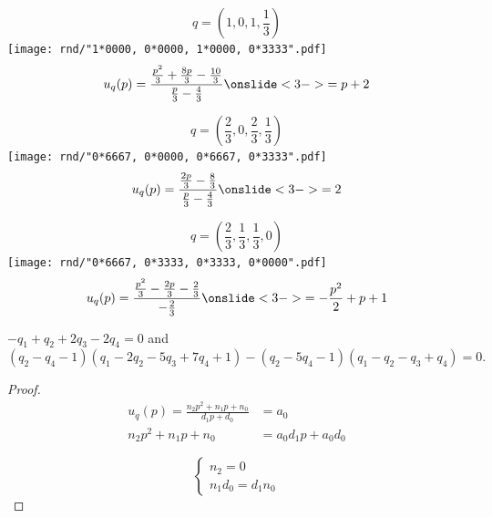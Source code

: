 \documentclass{beamer}
\begin{document}
\begin{frame}
  \centering
  \Large \[ q=\left(1, 0, 1, \frac{1}{3}\right) \]
  \texttt{[image: rnd/"1*0000, 0*0000, 1*0000, 0*3333".pdf]}
  \pause
  \small
    \begin{equation*} u_q(p) = \frac{\frac{p^2}{3} + \frac{8p}{3} - \frac{10}{3}}
                   {\frac{p}{3} - \frac{4}{3}} \onslide<3->{= p + 2}
    \end{equation*} 
\end{frame}

\begin{frame}
   \centering
   \Large \[ q=\left(\frac{2}{3}, 0, \frac{2}{3}, \frac{1}{3}\right) \]
   \texttt{[image: rnd/"0*6667, 0*0000, 0*6667, 0*3333".pdf]}
   \pause
   \small
    \begin{equation*} u_q(p) = \frac{\frac{2p}{3} - \frac{8}{3}}
                   {\frac{p}{3} - \frac{4}{3}} \onslide<3->{= 2}
    \end{equation*} 
 \end{frame}

\begin{frame}
  \centering
  \Large \[ q=\left(\frac{2}{3}, \frac{1}{3}, \frac{1}{3}, 0\right) \]
  \texttt{[image: rnd/"0*6667, 0*3333, 0*3333, 0*0000".pdf]}
   \pause
   \small
    \begin{equation*} u_q(p) = \frac{\frac{p^2}{3} - \frac{2p}{3} - \frac{2}{3}}
                   {- \frac{2}{3}} \onslide<3->{= -\frac{p^2}{2} + p + 1}
    \end{equation*} 
\end{frame}


\begin{frame}
\centering
\footnotesize
\begin{lemma}[Indifferent]\label{lemma:constant} 
\( -q_1 + q_2 + 2q_3 - 2q_4 = 0 \) and  \( (q_2 - q_4 - 1)(q_1 - 2q_2 - 5q_3 + 7q_4 + 1) -(q_2 - 5q_4 - 1)(q_1 - q_2 - q_3 + q_4) = 0 .\)
\end{lemma}

\centering
\begin{proof} 
\begin{align*}
u_q(p) = \frac{n_2p^2 + n_1p + n_0 } {d_1p + d_0} & = a_0 \\
n_2p^2 + n_1p + n_0 & = a_0d_1p + a_0d_0 
\end{align*}

\[\begin{cases}
          n_2  = 0\\
          n_1d_0 = d_1n_0
  \end{cases}\]

\end{proof}


\end{frame}
\end{document}
